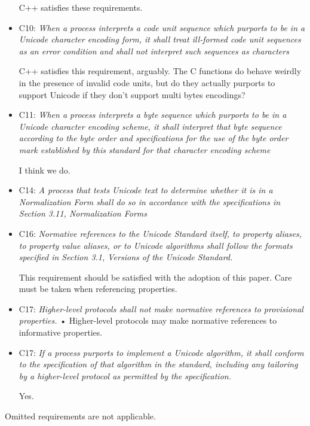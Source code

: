 \documentclass{wg21}
\begin{document}
\begin{itemize}
    C++ satisfies these requirements.

    \item C10: \emph{When a process interprets a code unit sequence which purports to be in a Unicode
        character encoding form, it shall treat ill-formed code unit sequences as an error condition and shall not interpret such sequences as characters}

    C++ satisfies this requirement, arguably. The C functions do behave weirdly in the presence of invalid code units, but do they actually purports to support Unicode if they don't support multi bytes encodings?

    \item C11: \emph{When a process interprets a byte sequence which purports to be in a Unicode character
        encoding scheme, it shall interpret that byte sequence according to the byte order and
        specifications for the use of the byte order mark established by this standard for that
        character encoding scheme}

    I think we do.

    \item C14: \emph{A process that tests Unicode text to determine whether it is in a Normalization Form
        shall do so in accordance with the specifications in Section 3.11, Normalization Forms}


    \item C16: \emph{Normative references to the Unicode Standard itself, to property aliases, to property
        value aliases, or to Unicode algorithms shall follow the formats specified in Section 3.1,
        Versions of the Unicode Standard.}

    This requirement should be satisfied with the adoption of this paper.
    Care must be taken when referencing properties.

    \item C17: \emph{Higher-level protocols shall not make normative references to provisional properties.}
    • Higher-level protocols may make normative references to informative properties.

    \item C17: \emph{If a process purports to implement a Unicode algorithm, it shall conform to the specification of that algorithm in the standard, including any tailoring by a higher-level protocol as permitted by the specification.}

    Yes.
\end{itemize}
Omitted requirements are not applicable.
\end{document}
